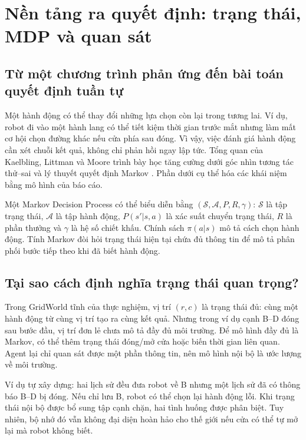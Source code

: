 \par
\section{Nền tảng ra quyết định: trạng thái, MDP và quan sát}
\subsection{Từ một chương trình phản ứng đến bài toán quyết định tuần tự}
Một hành động có thể thay đổi những lựa chọn còn lại trong tương lai. Ví dụ, robot đi
vào một hành lang có thể tiết kiệm thời gian trước mắt nhưng làm mất cơ hội chọn đường
khác nếu cửa phía sau đóng. Vì vậy, việc đánh giá hành động cần xét chuỗi kết quả,
không chỉ phản hồi ngay lập tức. Tổng quan của Kaelbling, Littman và Moore trình bày
học tăng cường dưới góc nhìn tương tác thử--sai và lý thuyết quyết định Markov
\cite{rlsurvey}. Phần dưới cụ thể hóa các khái niệm bằng mô hình của báo cáo.

Một Markov Decision Process có thể biểu diễn bằng $(\mathcal S,\mathcal A,P,R,\gamma)$:
$\mathcal S$ là tập trạng thái, $\mathcal A$ là tập hành động, $P(s'|s,a)$ là xác suất
chuyển trạng thái, $R$ là phần thưởng và $\gamma$ là hệ số chiết khấu. Chính sách
$\pi(a|s)$ mô tả cách chọn hành động. Tính Markov đòi hỏi trạng thái hiện tại chứa đủ
thông tin để mô tả phân phối bước tiếp theo khi đã biết hành động.

\subsection{Tại sao cách định nghĩa trạng thái quan trọng?}
Trong GridWorld tĩnh của thực nghiệm, vị trí $(r,c)$ là trạng thái đủ: cùng một hành
động từ cùng vị trí tạo ra cùng kết quả. Nhưng trong ví dụ cạnh B--D đóng sau bước
đầu, vị trí đơn lẻ chưa mô tả đầy đủ môi trường. Để mô hình đầy đủ là Markov, có thể
thêm trạng thái đóng/mở cửa hoặc biến thời gian liên quan. Agent lại chỉ quan sát
được một phần thông tin, nên mô hình nội bộ là ước lượng về môi trường.

Ví dụ tự xây dựng: hai lịch sử đều đưa robot về B nhưng một lịch sử đã có thông báo
B--D bị đóng. Nếu chỉ lưu B, robot có thể chọn lại hành động lỗi. Khi trạng thái nội
bộ được bổ sung tập cạnh chặn, hai tình huống được phân biệt. Tuy nhiên, bộ nhớ đó vẫn
không đại diện hoàn hảo cho thế giới nếu cửa có thể tự mở lại mà robot không biết.

